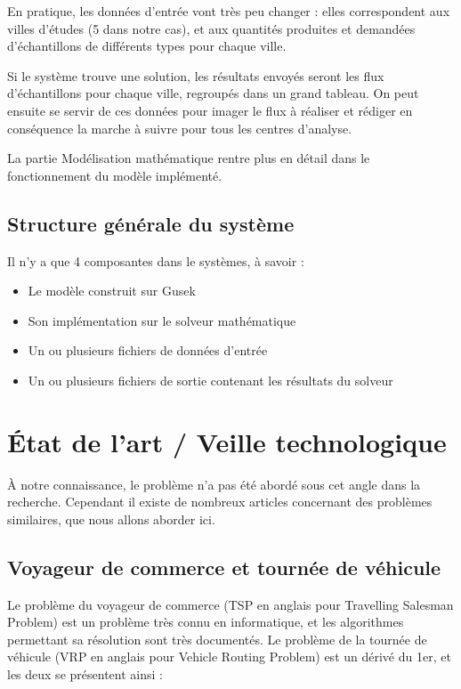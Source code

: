 \documentclass{polytech/polytech}
\numberwithin{figure}{chapter}
\begin{document}
En pratique, les données d'entrée vont très peu changer : elles correspondent aux villes d'études (5 dans notre cas), et aux quantités produites et demandées d'échantillons de différents types pour chaque ville.

Si le système trouve une solution, les résultats envoyés seront les flux d'échantillons pour chaque ville, regroupés dans un grand tableau. On peut ensuite se servir de ces données pour imager le flux à réaliser et rédiger en conséquence la marche à suivre pour tous les centres d'analyse.

La partie Modélisation mathématique rentre plus en détail dans le fonctionnement du modèle implémenté.

\section{Structure générale du système}

Il n'y a que 4 composantes dans le systèmes, à savoir : 
\begin{itemize}
    \item Le modèle construit sur Gusek
    \item Son implémentation sur le solveur mathématique
    \item Un ou plusieurs fichiers de données d'entrée
    \item Un ou plusieurs fichiers de sortie contenant les résultats du solveur
\end{itemize}

\chapter{État de l'art / Veille technologique}

À notre connaissance, le problème n'a pas été abordé sous cet angle dans la recherche. Cependant il existe de nombreux articles concernant des problèmes similaires, que nous allons aborder ici.

\section{Voyageur de commerce et tournée de véhicule}

Le problème du voyageur de commerce (TSP en anglais pour Travelling Salesman Problem) est un problème très connu en informatique, et les algorithmes permettant sa résolution sont très documentés. Le problème de la tournée de véhicule (VRP en anglais pour Vehicle Routing Problem) est un dérivé du 1er, et les deux se présentent ainsi : 
\end{document}
